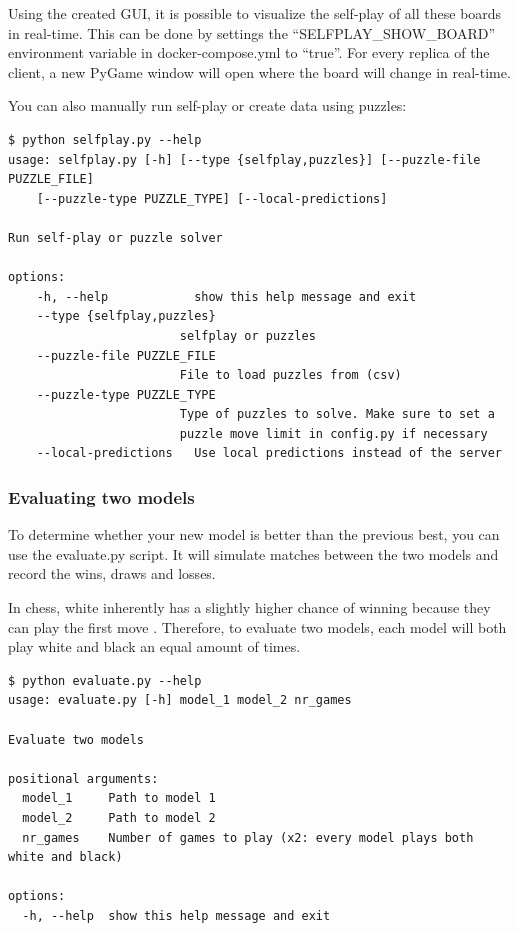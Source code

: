 \documentclass{article}
\begin{document}
Using the created GUI, it is possible to visualize the self-play of all these boards in real-time.
This can be done by settings the ``SELFPLAY\_SHOW\_BOARD'' environment variable in docker-compose.yml to ``true''.
For every replica of the client, a new PyGame window will open where the board will change in real-time. 

You can also manually run self-play or create data using puzzles:

\begin{verbatim}
$ python selfplay.py --help
usage: selfplay.py [-h] [--type {selfplay,puzzles}] [--puzzle-file PUZZLE_FILE] 
    [--puzzle-type PUZZLE_TYPE] [--local-predictions]

Run self-play or puzzle solver

options:
    -h, --help            show this help message and exit
    --type {selfplay,puzzles}
                        selfplay or puzzles
    --puzzle-file PUZZLE_FILE
                        File to load puzzles from (csv)
    --puzzle-type PUZZLE_TYPE
                        Type of puzzles to solve. Make sure to set a 
                        puzzle move limit in config.py if necessary
    --local-predictions   Use local predictions instead of the server
\end{verbatim}

\subsubsection{Evaluating two models}

To determine whether your new model is better than the previous best, you can use the evaluate.py script.
It will simulate matches between the two models and record the wins, draws and losses.

In chess, white inherently has a slightly higher chance of winning because they can play the first move \cite{FirstmoveAdvantageChess2022}.
Therefore, to evaluate two models, each model will both play white and black an equal amount of times.

\begin{verbatim}
$ python evaluate.py --help
usage: evaluate.py [-h] model_1 model_2 nr_games

Evaluate two models

positional arguments:
  model_1     Path to model 1
  model_2     Path to model 2
  nr_games    Number of games to play (x2: every model plays both white and black)

options:
  -h, --help  show this help message and exit
\end{verbatim}
\end{document}
